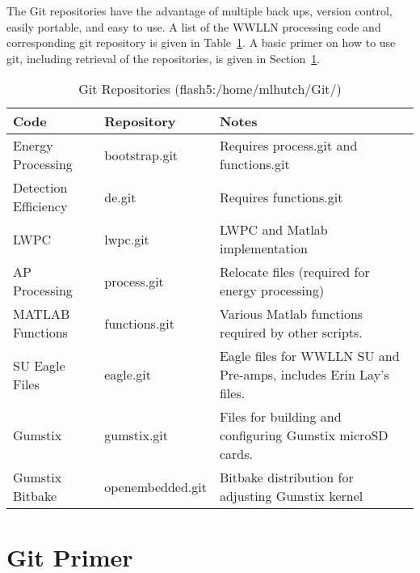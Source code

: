 The Git repositories have the advantage of multiple back ups, version control, easily portable, and easy to use.
A list of the WWLLN processing code and corresponding git repository is given in Table~\ref{code:table:repo}.
A basic primer on how to use git, including retrieval of the repositories, is given in Section~\ref{code:section:primer}.

\begin{table}[h!]
\caption{Git Repositories (flash5:/home/mlhutch/Git/)}
\begin{center}
\begin{tabular}{|p{1.5in}|p{1.25in}|p{3in}|}

\hline
{\bf Code} &	{\bf Repository} &	{\bf Notes}\\

\hline
\rule{0pt}{3ex}
Energy Processing	&bootstrap.git	&	Requires process.git and functions.git \\ 

\hline
\rule{0pt}{3ex}
Detection Efficiency	&de.git	&	Requires functions.git\\ 

\hline
\rule{0pt}{3ex}
LWPC	&lwpc.git	&	LWPC and Matlab implementation\\ 

\hline
\rule{0pt}{3ex}
AP Processing	&process.git	&	Relocate files (required for energy processing)\\ 

\hline
\rule{0pt}{3ex}
MATLAB Functions	&functions.git	&	Various Matlab functions required by other scripts.\\ 

\hline
\rule{0pt}{3ex}
SU Eagle Files	&eagle.git	&	Eagle files for WWLLN SU and Pre-amps, includes Erin Lay's files.\\ 

\hline
\rule{0pt}{3ex}
Gumstix	&gumstix.git	&	Files for building and configuring Gumstix microSD cards.\\ 

\hline
\rule{0pt}{3ex}
Gumstix Bitbake	&openembedded.git	&	Bitbake distribution for adjusting Gumstix kernel\\ 

\hline
\end{tabular}
\end{center}
\label{code:table:repo}
\end{table}

\section{Git Primer}
\label{code:section:primer}

